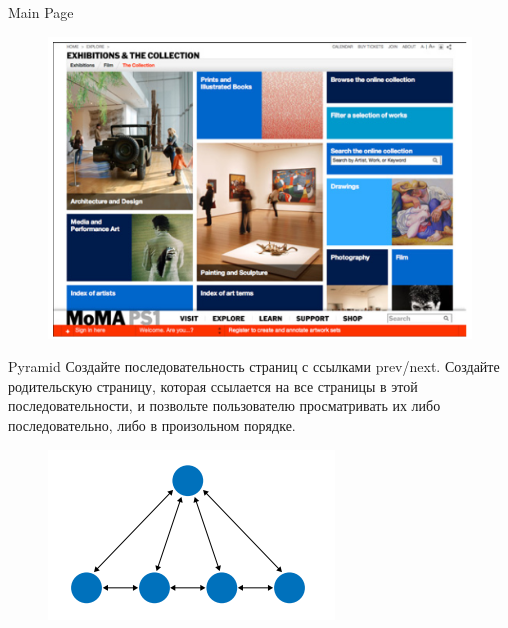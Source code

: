 \documentclass{beamer}
\begin{document}
\begin{frame}[t]{Main Page}
	\begin{figure}[h]
		\centering
		\includegraphics[scale=0.6]{images/lec07-pic27.png}
	\end{figure}
\end{frame}

\begin{frame}[t]{Pyramid}
	Создайте последовательность страниц с ссылками prev/next. Создайте родительскую страницу, которая ссылается на все страницы в этой последовательности, и позвольте пользователю просматривать их либо последовательно, либо в произольном порядке. 
	\begin{figure}[h]
		\centering
		\includegraphics[scale=0.75]{images/lec07-pic28.png}
	\end{figure}
\end{frame}
\end{document}
